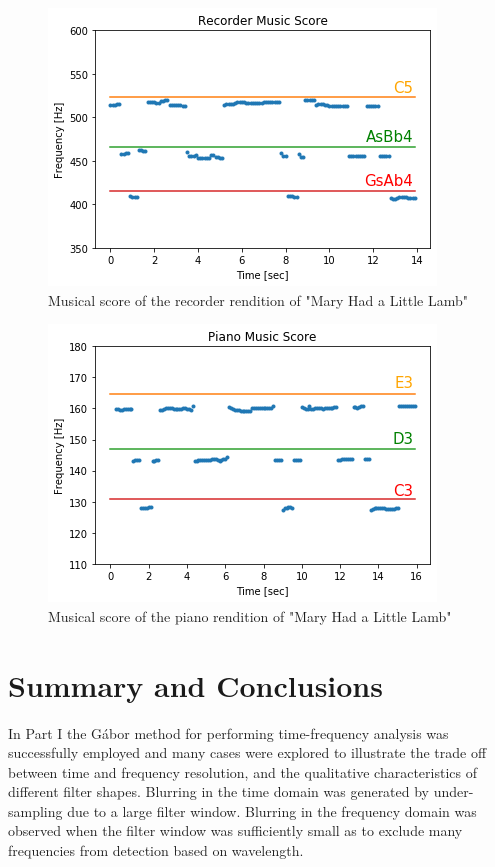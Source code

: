 \documentclass{article}
\begin{document}
\begin{figure}
    \centering
    \includegraphics[width=0.75\linewidth]{HW2_DanielBurnham_files/HW2_DanielBurnham_16_1.png}
    \caption{Musical score of the recorder rendition of "Mary Had a Little Lamb"}
    \label{fig:recScore}
\end{figure}
\begin{figure}
    \centering
    \includegraphics[width=0.75\linewidth]{HW2_DanielBurnham_files/HW2_DanielBurnham_17_1.png}
    \caption{Musical score of the piano rendition of "Mary Had a Little Lamb"}
    \label{fig:pianoScore}
\end{figure}

\section{Summary and Conclusions}
In Part I the G\'abor method for performing time-frequency analysis was successfully employed and many cases were explored to illustrate the trade off between time and frequency resolution, and the qualitative characteristics of different filter shapes. Blurring in the time domain was generated by under-sampling due to a large filter window. Blurring in the frequency domain was observed when the filter window was sufficiently small as to exclude many frequencies from detection based on wavelength.
\end{document}
